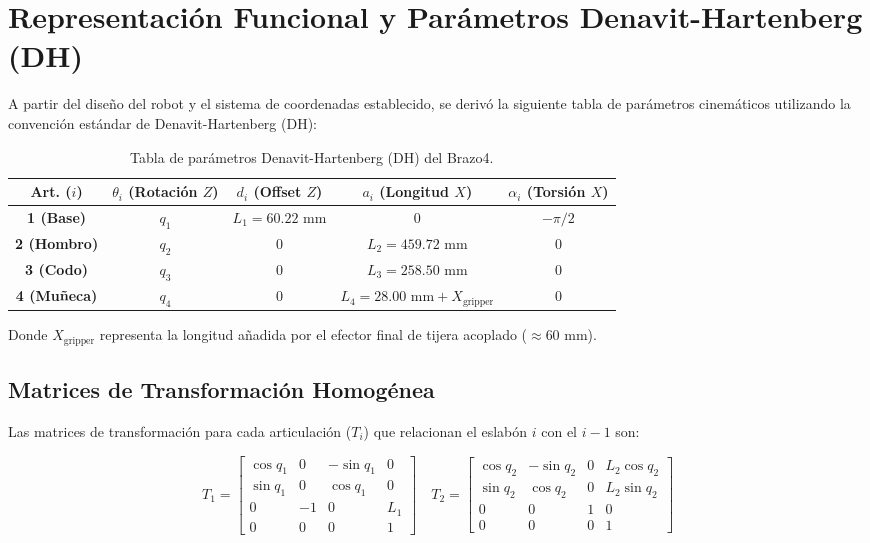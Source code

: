 
\section{Representación Funcional y Parámetros Denavit-Hartenberg (DH)}

A partir del diseño del robot y el sistema de coordenadas establecido, se derivó la siguiente tabla de parámetros cinemáticos utilizando la convención estándar de Denavit-Hartenberg (DH):

\begin{table}[h!]
\centering
\begin{tabular}{|c|c|c|c|c|}
\hline
\textbf{Art. ($i$)} & \textbf{$\theta_i$ (Rotación $Z$)} & \textbf{$d_i$ (Offset $Z$)} & \textbf{$a_i$ (Longitud $X$)} & \textbf{$\alpha_i$ (Torsión $X$)} \\ \hline
\textbf{1 (Base)} & $q_1$ & $L_1 = 60.22\text{ mm}$ & $0$ & $-\pi / 2$ \\ \hline
\textbf{2 (Hombro)} & $q_2$ & $0$ & $L_2 = 459.72\text{ mm}$ & $0$ \\ \hline
\textbf{3 (Codo)} & $q_3$ & $0$ & $L_3 = 258.50\text{ mm}$ & $0$ \\ \hline
\textbf{4 (Muñeca)} & $q_4$ & $0$ & $L_4 = 28.00\text{ mm} + X_{\text{gripper}}$ & $0$ \\ \hline
\end{tabular}
\caption{Tabla de parámetros Denavit-Hartenberg (DH) del Brazo4.}
\label{tab:dh_parameters}
\end{table}

Donde $X_{\text{gripper}}$ representa la longitud añadida por el efector final de tijera acoplado ($\approx 60\text{ mm}$).

\subsection{Matrices de Transformación Homogénea}

Las matrices de transformación para cada articulación ($T_i$) que relacionan el eslabón $i$ con el $i-1$ son:

\begin{equation*}
T_1 = \begin{bmatrix} 
\cos q_1 & 0 & -\sin q_1 & 0 \\ 
\sin q_1 & 0 & \cos q_1 & 0 \\ 
0 & -1 & 0 & L_1 \\ 
0 & 0 & 0 & 1 
\end{bmatrix}
\quad
T_2 = \begin{bmatrix} 
\cos q_2 & -\sin q_2 & 0 & L_2 \cos q_2 \\ 
\sin q_2 & \cos q_2 & 0 & L_2 \sin q_2 \\ 
0 & 0 & 1 & 0 \\ 
0 & 0 & 0 & 1 
\end{bmatrix}
\end{equation*}

